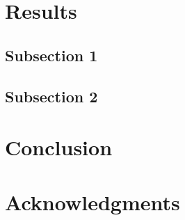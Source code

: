 \documentclass[10pt,letterpaper]{article}
\begin{document}
\lipsum[1]


\section{Results}

\subsection{Subsection 1}

\lipsum[1]

\subsection{Subsection 2}

\lipsum[1]



\section{Conclusion}
\lipsum[1-3]

\section{Acknowledgments}

\lipsum[1]




\setlength{\bibleftmargin}{.125in}
\setlength{\bibindent}{-\bibleftmargin}


\end{document}
